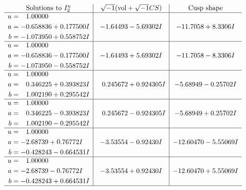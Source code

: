 \documentclass[1p]{elsarticle_modified}
\theoremstyle{definition}
\newcommand{\I}{\sqrt{-1}}
\begin{document}
$$\begin{array}{c|c|c}  
\text{Solutions to }I^u_{2}& \I (\text{vol} + \sqrt{-1}CS) & \text{Cusp shape}\\
 \hline 
\begin{aligned}
u &= \phantom{-}1.00000\phantom{ +0.000000I} \\
a &= -0.658836 + 0.177500 I \\
b &= -1.073950 + 0.558752 I\end{aligned}
 & -1.64493 - 5.69302 I & -11.7058 + 8.3306 I \\ \hline\begin{aligned}
u &= \phantom{-}1.00000\phantom{ +0.000000I} \\
a &= -0.658836 - 0.177500 I \\
b &= -1.073950 - 0.558752 I\end{aligned}
 & -1.64493 + 5.69302 I & -11.7058 - 8.3306 I \\ \hline\begin{aligned}
u &= \phantom{-}1.00000\phantom{ +0.000000I} \\
a &= \phantom{-}0.346225 + 0.393823 I \\
b &= \phantom{-}1.002190 + 0.295542 I\end{aligned}
 & \phantom{-}0.245672 + 0.924305 I & -5.68949 - 0.25702 I \\ \hline\begin{aligned}
u &= \phantom{-}1.00000\phantom{ +0.000000I} \\
a &= \phantom{-}0.346225 - 0.393823 I \\
b &= \phantom{-}1.002190 - 0.295542 I\end{aligned}
 & \phantom{-}0.245672 - 0.924305 I & -5.68949 + 0.25702 I \\ \hline\begin{aligned}
u &= \phantom{-}1.00000\phantom{ +0.000000I} \\
a &= -2.68739 + 0.76772 I \\
b &= -0.428243 - 0.664531 I\end{aligned}
 & -3.53554 - 0.92430 I & -12.60470 - 5.55069 I \\ \hline\begin{aligned}
u &= \phantom{-}1.00000\phantom{ +0.000000I} \\
a &= -2.68739 - 0.76772 I \\
b &= -0.428243 + 0.664531 I\end{aligned}
 & -3.53554 + 0.92430 I & -12.60470 + 5.55069 I\\
 \hline 
 \end{array}$$\newpage\newpage\renewcommand{\arraystretch}{1}
\end{document}
